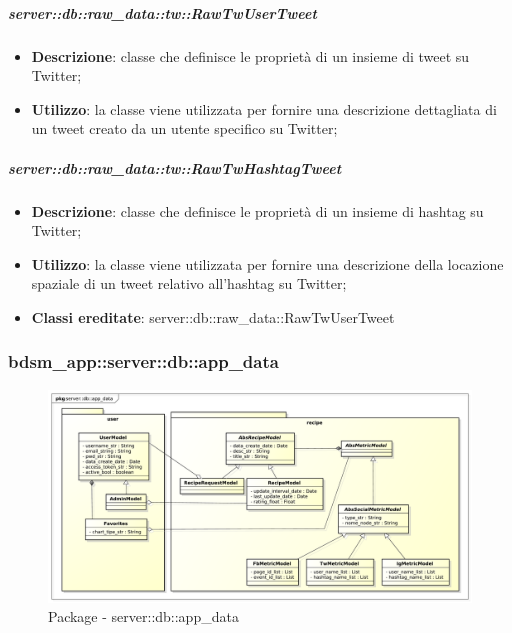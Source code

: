 		\subparagraph{server::db::raw\_data::tw::RawTwUserTweet} %
		\label{subp:server_db_raw_data_tw_rawtwusertweet}
			\begin{itemize}
				\item \textbf{Descrizione}: classe che definisce le proprietà di un insieme di tweet su Twitter;
				\item \textbf{Utilizzo}: la classe viene utilizzata per fornire una descrizione dettagliata di un tweet creato da un utente specifico su Twitter;
			\end{itemize}


		\subparagraph{server::db::raw\_data::tw::RawTwHashtagTweet} %
		\label{subp:server_db_raw_data_tw_rawtwhashtagtweet}
			\begin{itemize}
				\item \textbf{Descrizione}: classe che definisce le proprietà di un insieme di hashtag su Twitter;
				\item \textbf{Utilizzo}: la classe viene utilizzata per fornire una descrizione della locazione spaziale di un tweet relativo all'hashtag su Twitter;
				\item \textbf{Classi ereditate}: server::db::raw\_data::RawTwUserTweet
			\end{itemize}











\subsubsection{bdsm\_app::server::db::app\_data} %
\label{ssub:bdsm_app_server_app_data}


	\begin{figure}[htbp]
		\centering
		\centerline{\includegraphics[scale=0.38]{./images/server/app_data.pdf}}
		\caption{Package - server::db::app\_data}
	\end{figure}


